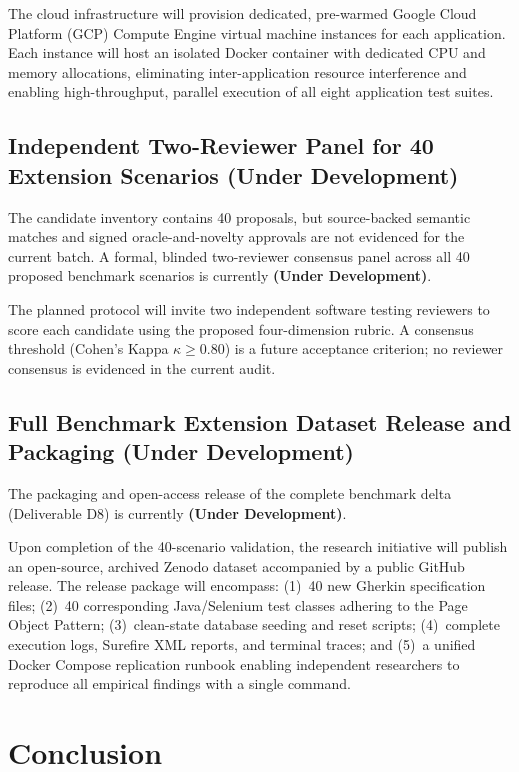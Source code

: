 \documentclass[pdflatex,sn-mathphys-num]{sn-jnl}
\begin{document}
The cloud infrastructure will provision dedicated, pre-warmed Google Cloud Platform (GCP) Compute Engine virtual machine instances for each application. Each instance will host an isolated Docker container with dedicated CPU and memory allocations, eliminating inter-application resource interference and enabling high-throughput, parallel execution of all eight application test suites.

\subsection{Independent Two-Reviewer Panel for 40 Extension Scenarios (Under Development)}\label{subsec:reviewer-panel-dev}

The candidate inventory contains 40 proposals, but source-backed semantic matches and signed oracle-and-novelty approvals are not evidenced for the current batch. A formal, blinded two-reviewer consensus panel across all 40 proposed benchmark scenarios is currently \textbf{(Under Development)}.

The planned protocol will invite two independent software testing reviewers to score each candidate using the proposed four-dimension rubric. A consensus threshold (Cohen's Kappa $\kappa \ge 0.80$) is a future acceptance criterion; no reviewer consensus is evidenced in the current audit.

\subsection{Full Benchmark Extension Dataset Release and Packaging (Under Development)}\label{subsec:release-packaging-dev}

The packaging and open-access release of the complete benchmark delta (Deliverable D8) is currently \textbf{(Under Development)}. 

Upon completion of the 40-scenario validation, the research initiative will publish an open-source, archived Zenodo dataset accompanied by a public GitHub release. The release package will encompass: (1)~40 new Gherkin specification files; (2)~40 corresponding Java/Selenium test classes adhering to the Page Object Pattern; (3)~clean-state database seeding and reset scripts; (4)~complete execution logs, Surefire XML reports, and terminal traces; and (5)~a unified Docker Compose replication runbook enabling independent researchers to reproduce all empirical findings with a single command.


\section{Conclusion}\label{sec:conclusion}
\end{document}
